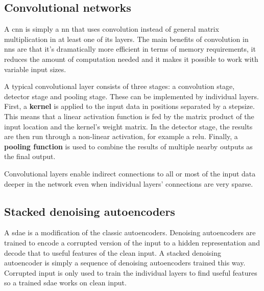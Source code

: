\subsection{Convolutional networks}

A \ac{cnn} is simply a \ac{nn} that uses convolution instead of general matrix
multiplication in at least one of its layers. The main benefits of convolution in \ac{nn}s
are that it's dramatically more efficient in terms of memory requirements, it reduces
the amount of computation needed and it makes it possible to work with variable input
sizes.

A typical convolutional layer consists of three stages: a convolution stage, detector
stage and pooling stage. These can be implemented by individual layers. First, a
\textbf{kernel} is applied to the input data in positions separated by a stepsize. This
means that a linear activation function is fed by the matrix product of the input location
and the kernel's weight matrix. In the detector stage, the results are then run through
a non-linear activation, for example a \ac{relu}. Finally, a \textbf{pooling function}
is used to combine the results of multiple nearby outputs as the final output.

Convolutional layers enable indirect connections to all or most of the input data deeper
in the network even when individual layers' connections are very sparse.

\subsection{Stacked denoising autoencoders}
A \ac{sdae} is a modification of the classic autoencoders. Denoising autoencoders
are trained to encode a corrupted version of the input to a hidden representation
and decode that to useful features of the clean input. A stacked denoising autoencoder
is simply a sequence of denoising autoencoders trained this way. Corrupted input
is only used to train the individual layers to find useful features so a trained
\ac{sdae} works on clean input.~\cite{SDAE}
